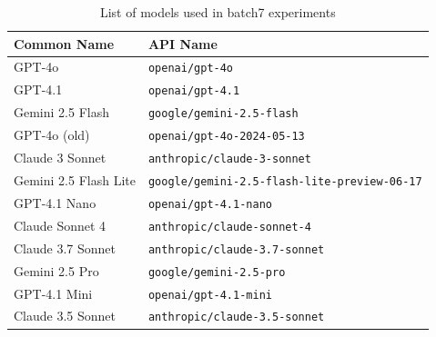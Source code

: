 \begin{table}[h]
\centering
\caption{List of models used in batch7 experiments}
\label{tab:batch7_models}
\begin{tabular}{ll}
\toprule
\textbf{Common Name} & \textbf{API Name} \\
\midrule
GPT-4o & \texttt{openai/gpt-4o} \\
GPT-4.1 & \texttt{openai/gpt-4.1} \\
Gemini 2.5 Flash & \texttt{google/gemini-2.5-flash} \\
GPT-4o (old) & \texttt{openai/gpt-4o-2024-05-13} \\
Claude 3 Sonnet & \texttt{anthropic/claude-3-sonnet} \\
Gemini 2.5 Flash Lite & \texttt{google/gemini-2.5-flash-lite-preview-06-17} \\
GPT-4.1 Nano & \texttt{openai/gpt-4.1-nano} \\
Claude Sonnet 4 & \texttt{anthropic/claude-sonnet-4} \\
Claude 3.7 Sonnet & \texttt{anthropic/claude-3.7-sonnet} \\
Gemini 2.5 Pro & \texttt{google/gemini-2.5-pro} \\
GPT-4.1 Mini & \texttt{openai/gpt-4.1-mini} \\
Claude 3.5 Sonnet & \texttt{anthropic/claude-3.5-sonnet} \\
\bottomrule
\end{tabular}
\end{table}